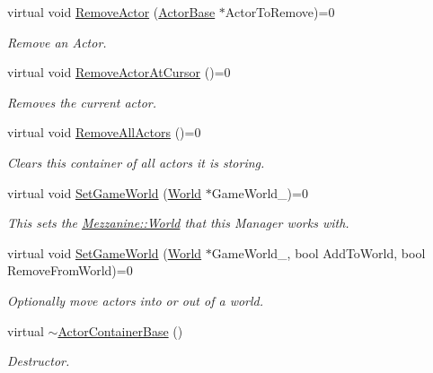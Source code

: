 \begin{DoxyCompactItemize}
virtual void \hyperlink{classMezzanine_1_1ActorContainerBase_a25052e0fc2dcf1eab9cfc909d68de60c}{RemoveActor} (\hyperlink{classMezzanine_1_1ActorBase}{ActorBase} $\ast$ActorToRemove)=0
\begin{DoxyCompactList}\small\item\em Remove an Actor. \item\end{DoxyCompactList}\item 
virtual void \hyperlink{classMezzanine_1_1ActorContainerBase_a00fa640707739e2a94b91a09873d7dcc}{RemoveActorAtCursor} ()=0
\begin{DoxyCompactList}\small\item\em Removes the current actor. \item\end{DoxyCompactList}\item 
\hypertarget{classMezzanine_1_1ActorContainerBase_aca54c6e86a84ec84adb0b648309a6fd4}{
virtual void \hyperlink{classMezzanine_1_1ActorContainerBase_aca54c6e86a84ec84adb0b648309a6fd4}{RemoveAllActors} ()=0}
\label{classMezzanine_1_1ActorContainerBase_aca54c6e86a84ec84adb0b648309a6fd4}

\begin{DoxyCompactList}\small\item\em Clears this container of all actors it is storing. \item\end{DoxyCompactList}\item 
virtual void \hyperlink{classMezzanine_1_1ActorContainerBase_aed532e5416af4c896a85a78b707aeee9}{SetGameWorld} (\hyperlink{classMezzanine_1_1World}{World} $\ast$GameWorld\_\-)=0
\begin{DoxyCompactList}\small\item\em This sets the \hyperlink{classMezzanine_1_1World}{Mezzanine::World} that this Manager works with. \item\end{DoxyCompactList}\item 
virtual void \hyperlink{classMezzanine_1_1ActorContainerBase_a5dd1ea660dbbcb39d36e702c4e393f30}{SetGameWorld} (\hyperlink{classMezzanine_1_1World}{World} $\ast$GameWorld\_\-, bool AddToWorld, bool RemoveFromWorld)=0
\begin{DoxyCompactList}\small\item\em Optionally move actors into or out of a world. \item\end{DoxyCompactList}\item 
virtual \hyperlink{classMezzanine_1_1ActorContainerBase_aab089925fd04d1591f2932d25edf0f52}{$\sim$ActorContainerBase} ()
\begin{DoxyCompactList}\small\item\em Destructor. \item\end{DoxyCompactList}\end{DoxyCompactItemize}

